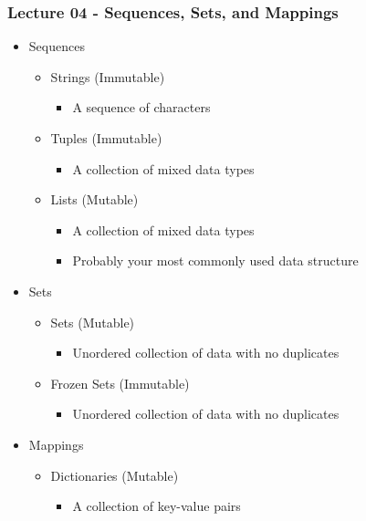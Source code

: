 \documentclass[mini frame in current subsection]{beamer}
\begin{document}
		\begin{frame}
			\frametitle{Lecture 04 - Sequences, Sets, and Mappings}
			\begin{itemize}
				\vfill\item  Sequences
					\begin{itemize}
						\item  Strings (Immutable)
							\begin{itemize}
								\item  A sequence of characters
							\end{itemize}
						\item  Tuples (Immutable)
							\begin{itemize}
								\item  A collection of mixed data types
							\end{itemize}
						\item  Lists (Mutable)
							\begin{itemize}
								\item A collection of mixed data types
								\item  Probably your most commonly used data structure
							\end{itemize}
					\end{itemize}
				\vfill\item  Sets
					\begin{itemize}
						\item  Sets (Mutable)
							\begin{itemize}
								\item  Unordered collection of data with no duplicates
							\end{itemize}
						\item  Frozen Sets (Immutable)
							\begin{itemize}
								\item  Unordered collection of data with no duplicates
							\end{itemize}
					\end{itemize}
				\vfill\item  Mappings
					\begin{itemize}
						\item  Dictionaries (Mutable)
							\begin{itemize}
								\item  A collection of key-value pairs
							\end{itemize}
					\end{itemize}
			\end{itemize}
		\end{frame}
		
\end{document}
